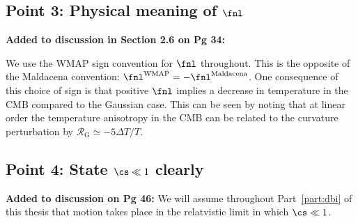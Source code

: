 \subsection{Point 3: Physical meaning of $\fnl$}
\textbf{Added to discussion in Section 2.6 on Pg 34:}

We use the WMAP sign convention for $\fnl$ throughout. 
This is the opposite of the Maldacena convention:
$\fnl^\mathrm{WMAP}=-\fnl^\mathrm{Maldacena}$. One consequence of this choice of sign is that
positive $\fnl$ implies a decrease in temperature in the CMB compared to the Gaussian case. This
can be seen by noting that at linear order the temperature anisotropy in the CMB can be related to
the curvature perturbation by $\mathcal{R}_\mathrm{G}\simeq -5 \Delta T/T$.

\subsection{Point 4: State $\cs\ll 1$ clearly}
\textbf{Added to discussion on Pg 46:}
We will assume throughout Part~\ref{part:dbi} of this thesis that motion takes
place in the relatvistic limit in which $\cs\ll1$.

